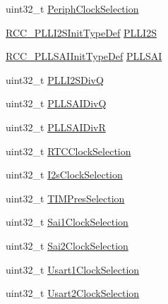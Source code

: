 \begin{DoxyCompactItemize}
\item 
uint32\+\_\+t \mbox{\hyperlink{struct_r_c_c___periph_c_l_k_init_type_def_a1fe6e3d75864d85b911eef15dfc35925}{Periph\+Clock\+Selection}}
\item 
\mbox{\hyperlink{struct_r_c_c___p_l_l_i2_s_init_type_def}{R\+C\+C\+\_\+\+P\+L\+L\+I2\+S\+Init\+Type\+Def}} \mbox{\hyperlink{struct_r_c_c___periph_c_l_k_init_type_def_acc2f1ab5bca1f524c6dc9f7b8dce747d}{P\+L\+L\+I2S}}
\item 
\mbox{\hyperlink{struct_r_c_c___p_l_l_s_a_i_init_type_def}{R\+C\+C\+\_\+\+P\+L\+L\+S\+A\+I\+Init\+Type\+Def}} \mbox{\hyperlink{struct_r_c_c___periph_c_l_k_init_type_def_a5bfc6178ab362422276fcc36be9ba7a9}{P\+L\+L\+S\+AI}}
\item 
uint32\+\_\+t \mbox{\hyperlink{struct_r_c_c___periph_c_l_k_init_type_def_a158247326a43b3ce7eb1d2907ced6234}{P\+L\+L\+I2\+S\+DivQ}}
\item 
uint32\+\_\+t \mbox{\hyperlink{struct_r_c_c___periph_c_l_k_init_type_def_a08da65a7dcf29461768f246f37531cf5}{P\+L\+L\+S\+A\+I\+DivQ}}
\item 
uint32\+\_\+t \mbox{\hyperlink{struct_r_c_c___periph_c_l_k_init_type_def_aabce8358ea055ec42742106cc34ec3e0}{P\+L\+L\+S\+A\+I\+DivR}}
\item 
uint32\+\_\+t \mbox{\hyperlink{struct_r_c_c___periph_c_l_k_init_type_def_ad2c422d62b056a61d7bbb599c89dbc1e}{R\+T\+C\+Clock\+Selection}}
\item 
uint32\+\_\+t \mbox{\hyperlink{struct_r_c_c___periph_c_l_k_init_type_def_a52cf8098ab8dc8d9b5e56ed6c3702b89}{I2s\+Clock\+Selection}}
\item 
uint32\+\_\+t \mbox{\hyperlink{struct_r_c_c___periph_c_l_k_init_type_def_a18502c3bdf821d335ea8687affb4c275}{T\+I\+M\+Pres\+Selection}}
\item 
uint32\+\_\+t \mbox{\hyperlink{struct_r_c_c___periph_c_l_k_init_type_def_adc2a83ae9e108a3f7afb01c58f3a4f1a}{Sai1\+Clock\+Selection}}
\item 
uint32\+\_\+t \mbox{\hyperlink{struct_r_c_c___periph_c_l_k_init_type_def_a16f7cf65806df3589a4bab521315d8df}{Sai2\+Clock\+Selection}}
\item 
uint32\+\_\+t \mbox{\hyperlink{struct_r_c_c___periph_c_l_k_init_type_def_ab226e7c9c672d98516c16f96ca7473f6}{Usart1\+Clock\+Selection}}
\item 
uint32\+\_\+t \mbox{\hyperlink{struct_r_c_c___periph_c_l_k_init_type_def_a105ffb9ec6b544d1faae281484d9a98a}{Usart2\+Clock\+Selection}}
\item 

\end{DoxyCompactItemize}
